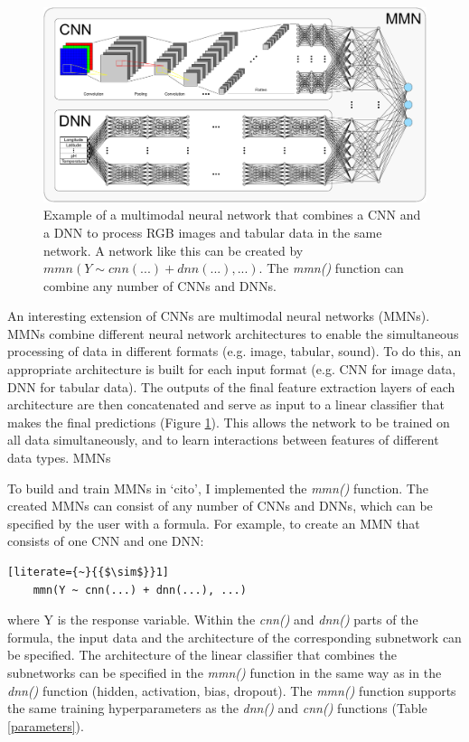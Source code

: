 \documentclass[12pt,twoside]{scrreport}
\newcommand{\pkg}[1]{`#1'}
\newcommand{\fn}[2][]{\textit{#2(}#1\textit{)}}
\begin{document}
\begin{figure}
	\includegraphics[width=\textwidth]{MMN.pdf}
	\caption{Example of a multimodal neural network that combines a CNN and a DNN to process RGB images and tabular data in the same network. A network like this can be created by $mmn(Y \sim cnn(...) + dnn(...), ...)$. The \fn{mmn} function can combine any number of CNNs and DNNs.}
	\label{MMN}
\end{figure}

An interesting extension of CNNs are multimodal neural networks (MMNs). MMNs combine different neural network architectures to enable the simultaneous processing of data in different formats (e.g. image, tabular, sound). To do this, an appropriate architecture is built for each input format (e.g. CNN for image data, DNN for tabular data). The outputs of the final feature extraction layers of each architecture are then concatenated and serve as input to a linear classifier that makes the final predictions (Figure \ref{MMN}). This allows the network to be trained on all data simultaneously, and to learn interactions between features of different data types. MMNs 

To build and train MMNs in \pkg{cito}, I implemented the \fn{mmn} function. The created MMNs can consist of any number of CNNs and DNNs, which can be specified by the user with a formula. For example, to create an MMN that consists of one CNN and one DNN:

\begin{lstlisting}[literate={~}{{$\sim$}}1]
	mmn(Y ~ cnn(...) + dnn(...), ...)
\end{lstlisting}

where Y is the response variable. Within the \fn{cnn} and \fn{dnn} parts of the formula, the input data and the architecture of the corresponding subnetwork can be specified. The architecture of the linear classifier that combines the subnetworks can be specified in the \fn{mmn} function in the same way as in the \fn{dnn} function (hidden, activation, bias, dropout). The \fn{mmn} function supports the same training hyperparameters as the \fn{dnn} and \fn{cnn} functions (Table \ref{parameters}).
\end{document}
